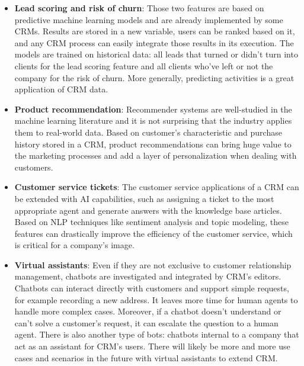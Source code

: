 \begin{itemize}
    \item \textbf{Lead scoring and risk of churn}: Those two features are based on predictive machine learning models and are already implemented by some CRMs. Results are stored in a new variable, users can be ranked based on it, and any CRM process can easily integrate those results in its execution. The models are trained on historical data: all leads that turned or didn't turn into clients for the lead scoring feature and all clients who've left or not the company for the risk of churn. More generally, predicting activities is a great application of CRM data.
    \item \textbf{Product recommendation}: Recommender systems are well-studied in the machine learning literature and it is not surprising that the industry applies them to real-world data. Based on customer's characteristic and purchase history stored in a CRM, product recommendations can bring huge value to the marketing processes and add a layer of personalization when dealing with customers.
    \item \textbf{Customer service tickets}: The customer service applications of a CRM can be extended with AI capabilities, such as assigning a ticket to the most appropriate agent and generate answers with the knowledge base articles. Based on NLP techniques like sentiment analysis and topic modeling, these features can drastically improve the efficiency of the customer service, which is critical for a company's image.
    \item \textbf{Virtual assistants}: Even if they are not exclusive to customer relationship management, chatbots are investigated and integrated by CRM's editors. Chatbots can interact directly with customers and support simple requests, for example recording a new address. It leaves more time for human agents to handle more complex cases. Moreover, if a chatbot doesn't understand or can't solve a customer's request, it can escalate the question to a human agent. There is also another type of bots: chatbots internal to a company that act as an assistant for CRM's users. There will likely be more and more use cases and scenarios in the future with virtual assistants to extend CRM.
\end{itemize}


